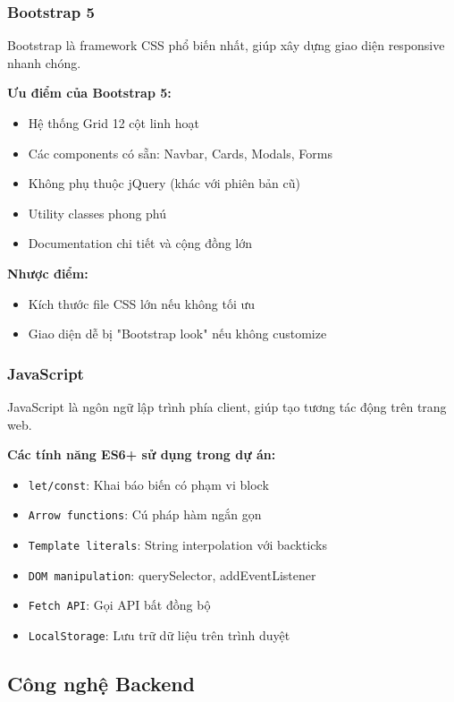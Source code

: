 \subsubsection{Bootstrap 5}

Bootstrap là framework CSS phổ biến nhất, giúp xây dựng giao diện responsive nhanh chóng.

\textbf{Ưu điểm của Bootstrap 5:}
\begin{itemize}
    \item Hệ thống Grid 12 cột linh hoạt
    \item Các components có sẵn: Navbar, Cards, Modals, Forms
    \item Không phụ thuộc jQuery (khác với phiên bản cũ)
    \item Utility classes phong phú
    \item Documentation chi tiết và cộng đồng lớn
\end{itemize}

\textbf{Nhược điểm:}
\begin{itemize}
    \item Kích thước file CSS lớn nếu không tối ưu
    \item Giao diện dễ bị "Bootstrap look" nếu không customize
\end{itemize}

\subsubsection{JavaScript}

JavaScript là ngôn ngữ lập trình phía client, giúp tạo tương tác động trên trang web.

\textbf{Các tính năng ES6+ sử dụng trong dự án:}
\begin{itemize}
    \item \texttt{let/const}: Khai báo biến có phạm vi block
    \item \texttt{Arrow functions}: Cú pháp hàm ngắn gọn
    \item \texttt{Template literals}: String interpolation với backticks
    \item \texttt{DOM manipulation}: querySelector, addEventListener
    \item \texttt{Fetch API}: Gọi API bất đồng bộ
    \item \texttt{LocalStorage}: Lưu trữ dữ liệu trên trình duyệt
\end{itemize}

\subsection{Công nghệ Backend}

